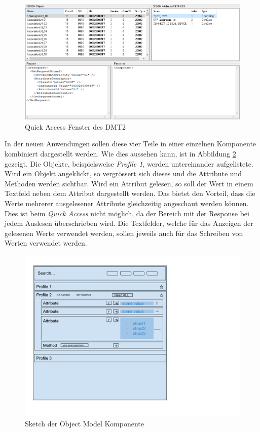 \begin{figure}
   \centering
   \includegraphics[width=1.0\textwidth]{gfx/UI_DMT2.png}
   \caption{
      Quick Access Fenster des \ac{DMT2}
      }
      \label{fig:dmt2QuickAccess}
\end{figure}
In der neuen Anwendungen sollen diese vier Teile in einer einzelnen Komponente kombiniert dargestellt werden.
Wie dies aussehen kann, ist in Abbildung \ref{fig:objectModelUIsktech} gezeigt.
Die Objekte, beispielsweise \textit{Profile 1}, werden untereinander aufgelistete.
Wird ein Objekt angeklickt, so vergrössert sich dieses und die Attribute und Methoden werden sichtbar.
Wird ein Attribut gelesen, so soll der Wert in einem Textfeld neben dem Attribut dargestellt werden.
Das bietet den Vorteil, dass die Werte mehrerer ausgelesener Attribute gleichzeitig angeschaut werden können. 
Dies ist beim \textit{Quick Access} nicht möglich, da der Bereich mit der Response bei jedem Auslesen überschrieben wird.
Die Textfelder, welche für das Anzeigen der gelesenen Werte verwendet werden, sollen jeweils auch für das Schreiben von Werten verwendet werden.

\begin{figure}
   \centering
   \includegraphics[width=1.0\textwidth]{gfx/Object Explorer Sketch.png}
   \caption{
      Sketch der Object Model Komponente
      }
      \label{fig:objectModelUIsktech}
\end{figure}


